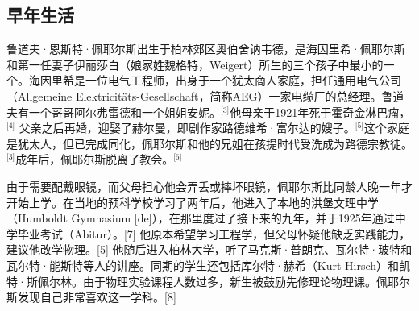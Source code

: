 \subsection{早年生活}
鲁道夫·恩斯特·佩耶尔斯出生于柏林郊区奥伯舍讷韦德，是海因里希·佩耶尔斯和第一任妻子伊丽莎白（娘家姓魏格特，Weigert）所生的三个孩子中最小的一个。海因里希是一位电气工程师，出身于一个犹太商人家庭，担任通用电气公司（Allgemeine Elektricitäts-Gesellschaft，简称AEG）一家电缆厂的总经理。鲁道夫有一个哥哥阿尔弗雷德和一个姐姐安妮。\(^\text{[3]}\)他母亲于1921年死于霍奇金淋巴瘤，\(^\text{[4]}\) 父亲之后再婚，迎娶了赫尔曼，即剧作家路德维希·富尔达的嫂子。\(^\text{[5]}\)这个家庭是犹太人，但已完成同化，佩耶尔斯和他的兄姐在孩提时代受洗成为路德宗教徒。\(^\text{[3]}\)成年后，佩耶尔斯脱离了教会。\(^\text{[6]}\)

由于需要配戴眼镜，而父母担心他会弄丢或摔坏眼镜，佩耶尔斯比同龄人晚一年才开始上学。在当地的预科学校学习了两年后，他进入了本地的洪堡文理中学（Humboldt Gymnasium [de]），在那里度过了接下来的九年，并于1925年通过中学毕业考试（Abitur）。[7] 他原本希望学习工程学，但父母怀疑他缺乏实践能力，建议他改学物理。[5] 他随后进入柏林大学，听了马克斯·普朗克、瓦尔特·玻特和瓦尔特·能斯特等人的讲座。同期的学生还包括库尔特·赫希（Kurt Hirsch）和凯特·斯佩尔林。由于物理实验课程人数过多，新生被鼓励先修理论物理课。佩耶尔斯发现自己非常喜欢这一学科。[8]
